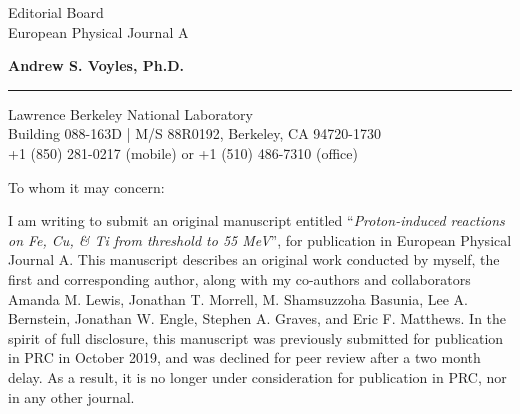 \documentclass{letter} %
\begin{document}
\signature{Andrew S. Voyles}           %
\longindentation=0pt                       %
\let\raggedleft\raggedright                %
 
 
\begin{letter}{
Editorial Board \\
European Physical Journal A}


\begin{flushleft}
{\large\bf Andrew S. Voyles, Ph.D.}
\end{flushleft}
\medskip\hrule height 1pt
\begin{flushright}
\hfill Lawrence Berkeley National Laboratory \\
\hfill Building 088-163D  |  M/S 88R0192, Berkeley, CA  94720-1730 \\
\hfill  +1 (850) 281-0217 (mobile) or +1 (510) 486-7310 (office) 
\end{flushright} 
\vfill %

 
\opening{To whom it may concern:} 

  \renewcommand*{\thefootnote}{\alph{footnote}}


  
\noindent I am writing to submit an original manuscript entitled \enquote{\emph{Proton-induced reactions on Fe, Cu, \& Ti from threshold to 55 MeV}},  for publication in European Physical Journal A. 
This manuscript describes an original work conducted by myself, the first and corresponding author, along with my co-authors and collaborators Amanda M. Lewis\footnotemark[1], Jonathan T. Morrell\footnotemark[1], M. Shamsuzzoha Basunia\footnotemark[2], Lee A. Bernstein\footnotemark[1]\footnotemark[2], 
Jonathan W. Engle\footnotemark[3], Stephen A. Graves\footnotemark[4], and Eric F. Matthews\footnotemark[1].
In the spirit of full disclosure, this manuscript was previously submitted for publication in PRC in October 2019, and was declined for peer review after a two month delay.
As a result, it is no longer under consideration for publication in PRC, nor in any other journal.


\end{letter}
\end{document}
